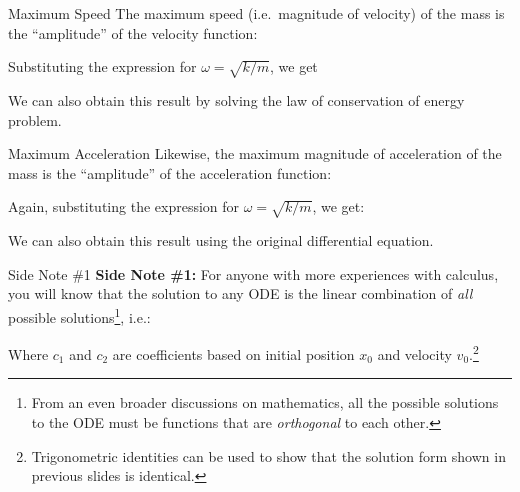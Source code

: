 \documentclass[12pt,compress,aspectratio=169]{beamer}
\begin{document}
\begin{frame}{Maximum Speed}
  The maximum speed (i.e.\ magnitude of velocity) of the mass is the
  ``amplitude'' of the velocity function:


  \vspace{-.05in}Substituting the expression for $\omega=\sqrt{k/m}$, we get
  

  We can also obtain this result by solving the law of conservation of energy
  problem. 
\end{frame}



\begin{frame}{Maximum Acceleration}
  Likewise, the maximum magnitude of acceleration of the mass is the
  ``amplitude'' of the acceleration function:


  \vspace{-.05in}Again, substituting the expression for $\omega=\sqrt{k/m}$, we
  get:
  

  We can also obtain this result using the original differential equation.
\end{frame}



\begin{frame}{Side Note \#1}
  \textbf{Side Note \#1:} For anyone with more experiences with calculus,
  you will know that the solution to any ODE is the linear combination of
  \emph{all} possible solutions\footnote{From an even broader discussions on
  mathematics, all the possible solutions to the ODE must be functions that are
  \emph{orthogonal} to each other.}, i.e.:


  \vspace{-.1in}Where $c_1$ and $c_2$ are coefficients based on initial
  position $x_0$ and velocity $v_0$.\footnote{Trigonometric identities can be
  used to show that the solution form shown in previous slides is identical.}
\end{frame}
\end{document}
